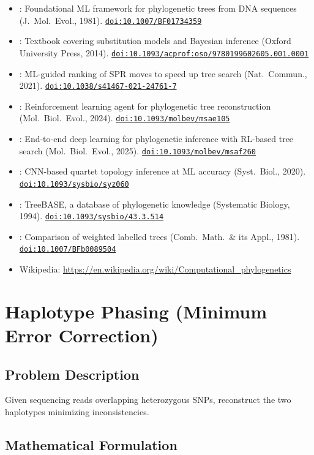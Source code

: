 \documentclass[11pt]{article}
\newcommand{\doi}[1]{\href{https://doi.org/#1}{\texttt{doi:#1}}}
\begin{document}
\begin{itemize}[noitemsep]
  \item \cite{Felsenstein1981}: Foundational ML framework for phylogenetic trees 
    from DNA sequences (J.\ Mol.\ Evol., 1981). \doi{10.1007/BF01734359}
  \item \cite{Yang2014}: Textbook covering substitution models and Bayesian inference 
    (Oxford University Press, 2014). \doi{10.1093/acprof:oso/9780199602605.001.0001}
  \item \cite{Azouri2021}: ML-guided ranking of SPR moves to speed up tree search 
    (Nat.\ Commun., 2021). \doi{10.1038/s41467-021-24761-7}
  \item \cite{AzouriRL2024}: Reinforcement learning agent for phylogenetic tree 
    reconstruction (Mol.\ Biol.\ Evol., 2024). \doi{10.1093/molbev/msae105}
  \item \cite{NeuralNJ2025}: End-to-end deep learning for phylogenetic inference with 
    RL-based tree search (Mol.\ Biol.\ Evol., 2025). \doi{10.1093/molbev/msaf260}
  \item \cite{Suvorov2020}: CNN-based quartet topology inference at ML accuracy 
    (Syst.\ Biol., 2020). \doi{10.1093/sysbio/syz060}
  \item \cite{TreeBASE}: TreeBASE, a database of phylogenetic knowledge
    (Systematic Biology, 1994). \doi{10.1093/sysbio/43.3.514}
  \item \cite{Robinson1981}: Comparison of weighted labelled trees
    (Comb.\ Math.\ \& its Appl., 1981). \doi{10.1007/BFb0089504}
  \item Wikipedia: \url{https://en.wikipedia.org/wiki/Computational_phylogenetics}
\end{itemize}

\section{Haplotype Phasing (Minimum Error Correction)}

\subsection*{Problem Description}

Given sequencing reads overlapping heterozygous SNPs, reconstruct the two haplotypes
minimizing inconsistencies.

\subsection*{Mathematical Formulation}
\end{document}
